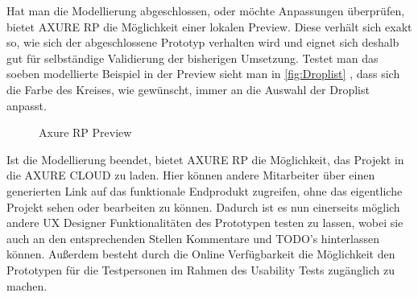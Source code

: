 Hat man die Modellierung abgeschlossen, oder möchte Anpassungen überprüfen, bietet AXURE RP die Möglichkeit einer lokalen Preview.
Diese verhält sich exakt so, wie sich der abgeschlossene Prototyp verhalten wird und eignet sich deshalb gut für selbständige Validierung der bisherigen Umsetzung.
Testet man das soeben modellierte Beispiel in der Preview sieht man in \cref{fig:Droplist} , dass sich die Farbe des Kreises, wie gewünscht, immer an die Auswahl der Droplist anpasst.
\begin{figure}%
\centering
{}%
\qquad
{}%
\qquad
{}%
\qquad
{}%

\caption{Axure RP Preview}%
\label{fig:Preview}
\end{figure}

Ist die Modellierung beendet, bietet AXURE RP die Möglichkeit, das Projekt in die AXURE CLOUD zu laden.
Hier können andere Mitarbeiter über einen generierten Link auf das funktionale Endprodukt zugreifen, ohne das eigentliche Projekt sehen oder bearbeiten zu können.
Dadurch ist es nun einerseits möglich andere UX Designer Funktionalitäten des Prototypen testen zu lassen, wobei sie auch an den entsprechenden Stellen Kommentare und TODO's hinterlassen können.
Außerdem besteht durch die Online Verfügbarkeit die Möglichkeit den Prototypen für die Testpersonen im Rahmen des Usability Tests zugänglich zu machen.

